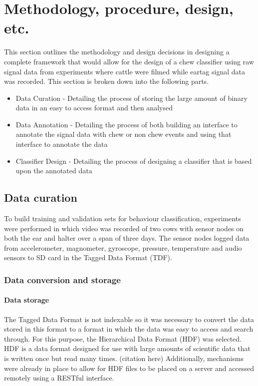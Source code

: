\chapter{Methodology, procedure, design, etc.}

This section outlines the methodology and design decisions in designing a complete framework that would allow for the design of a chew classifier using raw signal data from experiments where cattle were filmed while eartag signal data was recorded. This section is broken down into the following parts.

\begin{itemize}
\item Data Curation - Detailing the process of storing the large amount of binary data in an easy to access format and then analysed

\item Data Annotation - Detailing the process of both building an interface to annotate the signal data with chew or non chew events and using that interface to annotate the data

\item Classifier Design - Detailing the process of designing a classifier that is based upon the annotated data
\end{itemize}

\section{Data curation}

To build training and validation sets for behaviour classification, experiments were performed in which video was recorded of two cows with sensor nodes on both the ear and halter over a span of three days. The sensor nodes logged data from accelerometer, magnometer, gyroscope, pressure, temperature and audio sensors to SD card in the Tagged Data Format (TDF). 

\subsection{Data conversion and storage}

\subsubsection{Data storage}
The Tagged Data Format is not indexable so it was necessary to convert the data stored in this format to a format in which the data was easy to access and search through. For this purpose, the Hierarchical Data Format (HDF) was selected. HDF is a data format designed for use with large amounts of scientific data that is written once but read many times. (citation here) Additionally, mechanisms were already in place to allow for HDF files to be placed on a server and accessed remotely using a RESTful interface. 

